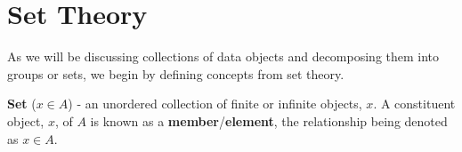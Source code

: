 
\section{Set Theory}

As we will be discussing collections of data objects and decomposing them into groups or sets, we begin by defining concepts from set theory.
%
\begin{defn}
  \textbf{Set} ($x \in A$) - an unordered collection of finite or infinite objects, $x$.
  A constituent object, $x$, of $A$ is known as a \textbf{member}/\textbf{element}, the relationship being denoted as $x \in A$.
\end{defn}

